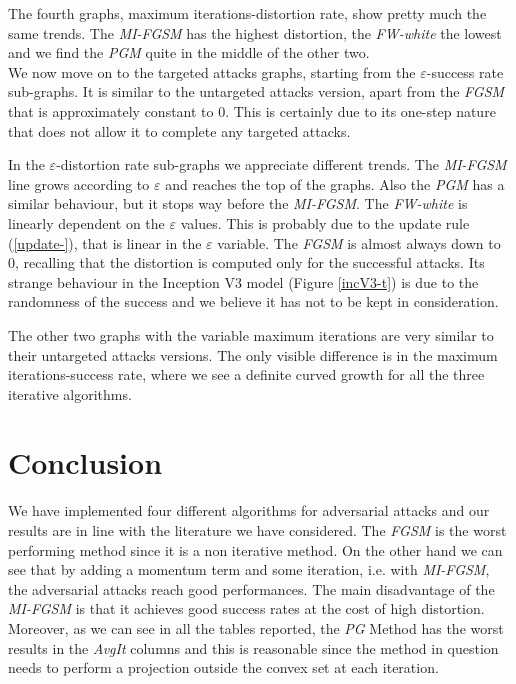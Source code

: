 \documentclass[10pt,twocolumn,letterpaper, english]{article}
\theoremstyle{definition}
\theoremstyle{plain}
\theoremstyle{plain}
\theoremstyle{plain}
\theoremstyle{plain}
\theoremstyle{remark}
\theoremstyle{remark}
\theoremstyle{definition}
\theoremstyle{definition}
\theoremstyle{definition}
\theoremstyle{definition}
\renewcommand{\epsilon}{\varepsilon}
\begin{document}
The fourth graphs, maximum iterations-distortion rate, show pretty much the same trends. 
The \textit{MI-FGSM} has the highest distortion, the \textit{FW-white} the lowest and we find the \textit{PGM} quite in the middle of the other two. \\

We now move on to the targeted attacks graphs, starting from the $\epsilon$-success rate sub-graphs. 
It is similar to the untargeted attacks version, apart from the \textit{FGSM} that is approximately constant to $0$. 
This is certainly due to its one-step nature that does not allow it to complete any targeted attacks. 

In the $\epsilon$-distortion rate sub-graphs we appreciate different trends. 
The \textit{MI-FGSM} line grows according to $\epsilon$ and reaches the top of the graphs. 
Also the \textit{PGM} has a similar behaviour, but it stops way before the \textit{MI-FGSM}. 
The \textit{FW-white} is linearly dependent on the $\epsilon$ values. 
This is probably due to the update rule (\ref{update-}), that is linear in the $\epsilon$ variable. 
The \textit{FGSM} is almost always down to $0$, recalling that the distortion is computed only for the successful attacks. 
Its strange behaviour in the Inception V3 model (Figure \ref{incV3-t}) is due to the randomness of the success and we believe it has not to be kept in consideration. 

The other two graphs with the variable maximum iterations are very similar to their untargeted attacks versions. 
The only visible difference is in the maximum iterations-success rate, where we see a definite curved growth for all the three iterative algorithms.


\section{Conclusion}

We have implemented four different algorithms for adversarial attacks and our results are in line with the literature we have considered. The \textit{FGSM} is the worst performing method since it is a non iterative method. On the other hand we can see that by adding a momentum term and some iteration, i.e. with \textit{MI-FGSM}, the adversarial attacks reach good performances. The main disadvantage of the \textit{MI-FGSM} is that it achieves good success rates at the cost of  high distortion. Moreover, as we can see in all the tables reported, the \textit{PG} Method has the worst results in the \textit{AvgIt} columns and this is reasonable since the method in question needs to perform a projection outside the convex set at each iteration.\\
\end{document}
